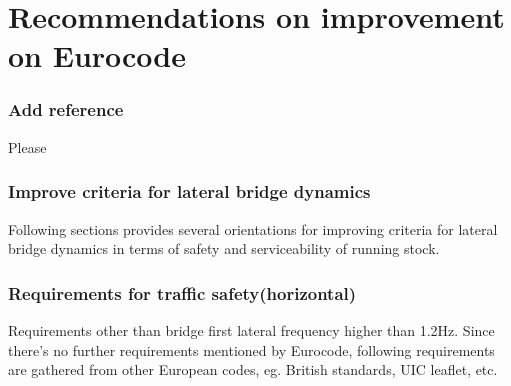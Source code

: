 \chapter{Recommendations on improvement on Eurocode}







\subsection{Add reference}
Please


\subsection{Improve criteria for lateral bridge dynamics}
Following sections provides several orientations for improving criteria for lateral bridge dynamics in terms of safety and serviceability of running stock.


\subsection{Requirements for traffic safety(horizontal)}
Requirements other than bridge first lateral frequency higher than 1.2Hz. Since there's no further requirements mentioned by Eurocode, following requirements are gathered from other European codes, eg. British standards, UIC leaflet, etc.

